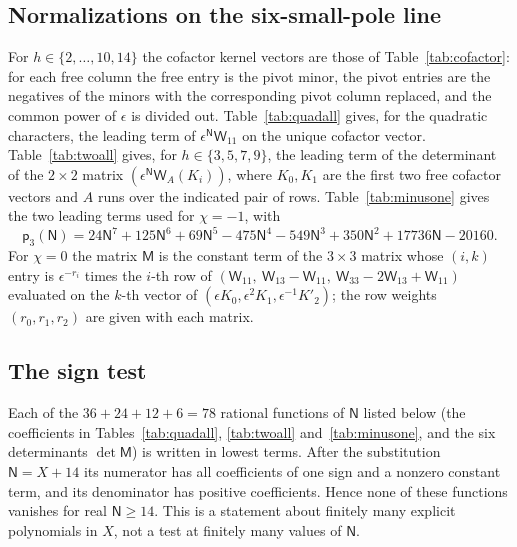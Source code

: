 \documentclass{amsart}
\theoremstyle{definition}
\theoremstyle{remark}
\numberwithin{equation}{section}
\begin{document}
\subsection*{Normalizations on the six-small-pole line}
For $h\in\{2,\dots,10,14\}$ the cofactor kernel vectors are those of Table~\ref{tab:cofactor}:
for each free column the free entry is the pivot minor, the pivot entries are the negatives
of the minors with the corresponding pivot column replaced, and the common power of $\epsilon$
is divided out. Table~\ref{tab:quadall} gives, for the quadratic characters, the leading term
of $\epsilon^{\mathsf N}\mathsf W_{11}$ on the unique cofactor vector. Table~\ref{tab:twoall}
gives, for $h\in\{3,5,7,9\}$, the leading term of the determinant of the $2\times2$ matrix
$(\epsilon^{\mathsf N}\mathsf W_A(K_i))$, where $K_0,K_1$ are the first two free cofactor
vectors and $A$ runs over the indicated pair of rows. Table~\ref{tab:minusone} gives the two
leading terms used for $\chi=-1$, with
\begin{equation}\label{eq:p3}
  \mathsf p_3(\mathsf N)=24\mathsf N^7+125\mathsf N^6+69\mathsf N^5-475\mathsf N^4
  -549\mathsf N^3+350\mathsf N^2+17736\mathsf N-20160 .
\end{equation}
For $\chi=0$ the matrix $\mathsf M$ is the constant term of the $3\times3$ matrix whose
$(i,k)$ entry is $\epsilon^{-r_i}$ times the $i$-th row of
$(\mathsf W_{11},\ \mathsf W_{13}-\mathsf W_{11},\ \mathsf W_{33}-2\mathsf W_{13}+\mathsf W_{11})$
evaluated on the $k$-th vector of $(\epsilon K_0,\epsilon^2K_1,\epsilon^{-1}K'_2)$; the row
weights $(r_0,r_1,r_2)$ are given with each matrix.

\subsection*{The sign test}
Each of the $36+24+12+6=78$ rational functions of $\mathsf N$ listed below (the coefficients in
Tables~\ref{tab:quadall}, \ref{tab:twoall} and~\ref{tab:minusone}, and the six determinants
$\det\mathsf M$) is written in lowest terms. After the substitution $\mathsf N=X+14$ its
numerator has all coefficients of one sign and a nonzero constant term, and its denominator
has positive coefficients. Hence none of these functions vanishes for real $\mathsf N\ge14$.
This is a statement about finitely many explicit polynomials in $X$, not a test at finitely
many values of $\mathsf N$.
\end{document}
